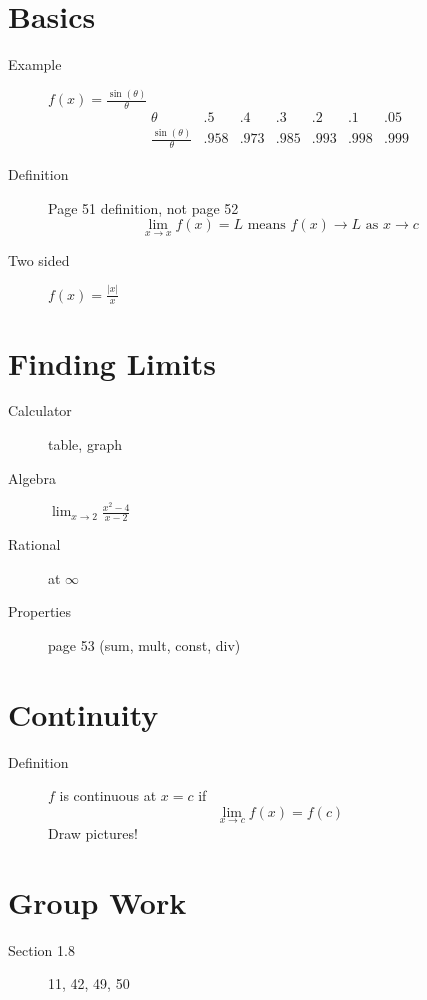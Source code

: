 \documentclass[11pt]{article}
\begin{document}
\drawtitle

\section*{Basics}
\begin{description}
\item[Example] $f(x)=\displaystyle\frac{\sin(\theta)}{\theta}$
\[
\begin{array}{c|c|c|c|c|c|c}
\theta&.5&.4&.3&.2&.1&.05\\
\hline
\frac{\sin(\theta)}{\theta}&.958&.973&.985&.993&.998&.999
\end{array}
\]
\item[Definition] Page 51 definition, not page 52
\[
\displaystyle\lim_{x\rightarrow x} f(x)=L\mbox{ means }f(x)\rightarrow
L\mbox{ as }x\rightarrow c
\]
\item[Two sided] $\displaystyle f(x)=\frac{|x|}{x}$
\end{description}

\section*{Finding Limits}
\begin{description}
\item[Calculator] table, graph
\item[Algebra] $\displaystyle\lim_{x\rightarrow 2}\frac{x^2-4}{x-2}$
\item[Rational] at $\infty$
\item[Properties] page 53 (sum, mult, const, div)
\end{description}

\section*{Continuity}
\begin{description}
\item[Definition] $f$ is continuous at $x=c$ if
\[
\displaystyle \lim_{x\rightarrow c} f(x) = f(c)
\]
Draw pictures!
\end{description}

\section*{Group Work}
\begin{description}
\item[Section 1.8] 11, 42, 49, 50
\end{description}
\end{document}
